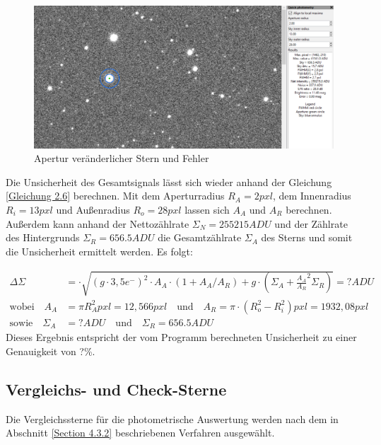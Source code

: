 \documentclass[ngerman,ruledheaders=section,class=report,thesis={type=Protokoll},accentcolor=1b,marginpar=false,parskip=half-,fontsize=11pt,]{tudapub}
\begin{document}
	\begin{figure}[h]
		\centering
		\includegraphics[width=0.8\linewidth]{Screenshot 2024-07-01 203800.png}
		\caption{Apertur veränderlicher Stern und Fehler}
		\label{Abbildung 4.42}
	\end{figure}
	
	Die Unsicherheit des Gesamtsignals lässt sich wieder anhand der Gleichung \ref{Gleichung 2.6} berechnen. Mit dem Aperturradius $R_A = 2\si{pxl}$, dem Innenradius $R_i =  13\si{pxl}$ und Außenradius $R_o =  28\si{pxl}$ lassen sich $A_A$ und $A_R$ berechnen. Außerdem kann anhand der Nettozählrate $\Sigma_N =  255215\si{ADU}$ und der Zählrate des Hintergrunds $\Sigma_R = 656.5\si{ADU}$ die Gesamtzählrate $\Sigma_A$ des Sterns und somit die Unsicherheit ermittelt werden. Es folgt:
	
	\begin{equation}
		\begin{aligned}
			\Delta \Sigma &= \cdot \sqrt{(g \cdot 3,5 e^-)^2 \cdot A_A \cdot (1 + A_A /A_R) + g \cdot \left( 
				\Sigma_A + \frac{A_A}{A_R}^2 \Sigma_R
				\right)} = ? \si{ADU} \\
			\text{wobei}
			\quad
			A_A &= \pi R_A ^2 \si{pxl}= 12,566 \si{pxl} 
			\quad 
			\text{und} 
			\quad
			A_R = \pi \cdot (R_o ^2 - R_i^2) \si{pxl} = 1932,08 \si{pxl} \\
			\text{sowie}
			\quad
			\Sigma_A &= ? \si{ADU} 
			\quad
			\text{und}
			\quad
			\Sigma_R = 656.5
			\si{ADU}
		\end{aligned}
	\end{equation}
	Dieses Ergebnis entspricht der vom Programm berechneten Unsicherheit zu einer Genauigkeit von ?\%. 
	
	\subsection{Vergleichs- und Check-Sterne}
	Die Vergleichssterne für die photometrische Auswertung werden nach dem in Abschnitt \ref{Section 4.3.2} beschriebenen Verfahren ausgewählt. 
	
\end{document}
